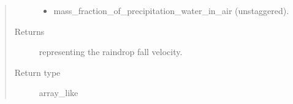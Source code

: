 \documentclass[letterpaper,10pt,english]{sphinxmanual}
\begin{document}
\begin{fulllineitems}
\begin{fulllineitems}
\begin{quote}
\begin{description}
\begin{itemize}
\item {} 
mass\_fraction\_of\_precipitation\_water\_in\_air (unstaggered).

\end{itemize}


\item[{Returns}] \leavevmode
{} representing the raindrop fall velocity.

\item[{Return type}] \leavevmode
array\_like

\end{description}\end{quote}

\end{fulllineitems}


\end{fulllineitems}

\end{document}
